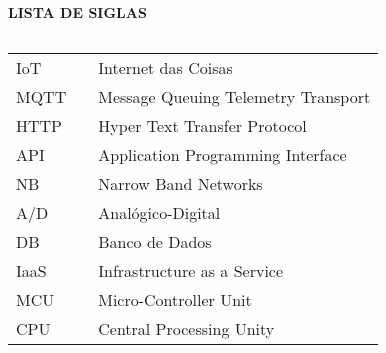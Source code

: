 \newpage

\begin{center}
\textbf{LISTA DE SIGLAS}
\end{center}
$\!$\\

\begin{tabular}{lll}
IoT & \hspace{1cm} & Internet das Coisas \\
MQTT & \hspace{1cm} & Message Queuing Telemetry Transport \\
HTTP & \hspace{1cm} & Hyper Text Transfer Protocol \\
API & \hspace{1cm} & Application Programming Interface \\
NB &\hspace{1cm} &  Narrow Band Networks \\
A/D & \hspace{1cm} & Analógico-Digital \\
DB &  \hspace{1cm} & Banco de Dados \\
IaaS & \hspace{1cm} & Infrastructure as a Service \\
MCU & \hspace{1cm} & Micro-Controller Unit \\
CPU & \hspace{1cm} & Central Processing Unity \\


\end{tabular}
